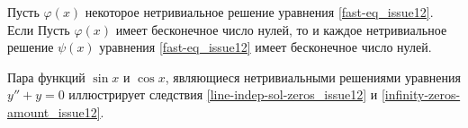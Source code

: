 \begin{corollary}\label{infinity-zeros-amount_issue12}
    Пусть $\varphi(x)$ некоторое нетривиальное решение уравнения \eqref{fast-eq_issue12}. Если Пусть $\varphi(x)$
    имеет бесконечное число нулей, то и каждое нетривиальное решение $\psi(x)$ уравнения \eqref{fast-eq_issue12} имеет бесконечное число нулей.
\end{corollary}

\begin{example}
    Пара функций $\sin x$ и $\cos x$, являющиеся нетривиальными решениями уравнения $y'' + y = 0$ 
    иллюстрирует следствия \ref{line-indep-sol-zeros_issue12} и \ref{infinity-zeros-amount_issue12}. 
\end{example}
